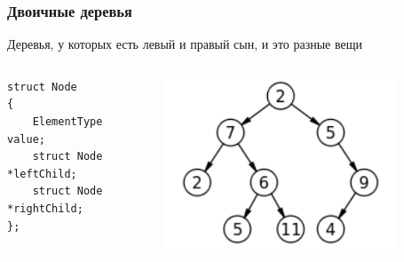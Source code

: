 \documentclass{../../slides-style}
\begin{document}
    \begin{frame}[fragile]
        \frametitle{Двоичные деревья}
        Деревья, у которых есть левый и правый сын, и это разные вещи
        \begin{columns}
            \begin{column}{0.4\textwidth}
                \begin{footnotesize}
                    \begin{verbatim}
struct Node
{
    ElementType value;
    struct Node *leftChild;
    struct Node *rightChild;
};
                    \end{verbatim}
                \end{footnotesize}
            \end{column}
            \begin{column}{0.5\textwidth}
                \begin{center}
                    \includegraphics[width=0.8\textwidth]{binary-tree.png}
                \end{center}
            \end{column}
        \end{columns}
    \end{frame}
\end{document}
